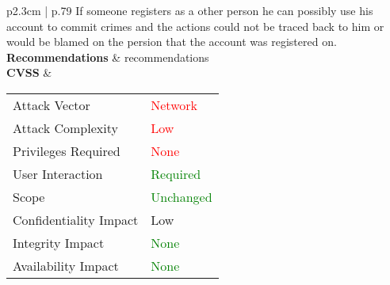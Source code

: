 \begin{longtable}[l]{p{2.3cm} | p{.79\linewidth}}
       If someone registers as a other person he can possibly use his account to commit crimes and the actions could not be traced back to him or would be blamed on the persion that the account was registered on.
    \\
    \textbf{Recommen\-dations} & recommendations \\ \hline
    \textbf{CVSS} &
        \begin{tabular}[t]{@{}l | l}
            Attack Vector           & \textcolor{red}{Network} \\
            Attack Complexity       & \textcolor{red}{Low} \\
            Privileges Required     & \textcolor{red}{None} \\
            User Interaction        & \textcolor{Green}{Required} \\
            Scope                   & \textcolor{Green}{Unchanged} \\
            Confidentiality Impact  & \textcolor{BurntOrange}{Low} \\
            Integrity Impact        & \textcolor{Green}{None} \\
            Availability Impact     & \textcolor{Green}{None}
        \end{tabular}
    \\
    \hline
\end{longtable}
\clearpage

